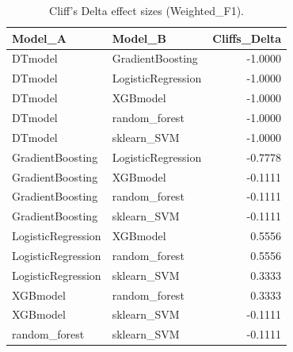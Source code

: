 \begin{table}[t]
\centering
\begin{tabular}{llr}
\toprule
Model_A & Model_B & Cliffs_Delta \\
\midrule
DTmodel & GradientBoosting & -1.0000 \\
DTmodel & LogisticRegression & -1.0000 \\
DTmodel & XGBmodel & -1.0000 \\
DTmodel & random_forest & -1.0000 \\
DTmodel & sklearn_SVM & -1.0000 \\
GradientBoosting & LogisticRegression & -0.7778 \\
GradientBoosting & XGBmodel & -0.1111 \\
GradientBoosting & random_forest & -0.1111 \\
GradientBoosting & sklearn_SVM & -0.1111 \\
LogisticRegression & XGBmodel & 0.5556 \\
LogisticRegression & random_forest & 0.5556 \\
LogisticRegression & sklearn_SVM & 0.3333 \\
XGBmodel & random_forest & 0.3333 \\
XGBmodel & sklearn_SVM & -0.1111 \\
random_forest & sklearn_SVM & -0.1111 \\
\bottomrule
\end{tabular}
\caption{Cliff's Delta effect sizes (Weighted_F1).}
\label{tab:cliffs_Weighted_F1}
\end{table}